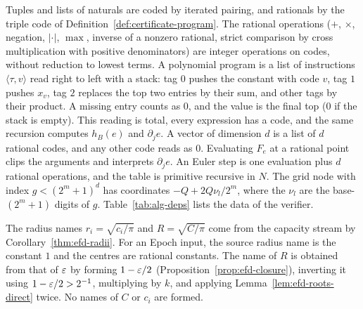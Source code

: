 Tuples and lists of naturals are coded by iterated pairing, and rationals by the triple code of Definition~\ref{def:certificate-program}. The rational operations ($+$, $\times$, negation, $|\cdot|$, $\max$, inverse of a nonzero rational, strict comparison by cross multiplication with positive denominators) are integer operations on codes, without reduction to lowest terms. A polynomial program is a list of instructions $\langle\tau,v\rangle$ read right to left with a stack: tag $0$ pushes the constant with code $v$, tag $1$ pushes $x_v$, tag $2$ replaces the top two entries by their sum, and other tags by their product. A missing entry counts as $0$, and the value is the final top ($0$ if the stack is empty). This reading is total, every expression has a code, and the same recursion computes $h_B(e)$ and $\partial_je$. A vector of dimension $d$ is a list of $d$ rational codes, and any other code reads as $0$. Evaluating $F_e$ at a rational point clips the arguments and interprets $\partial_je$. An Euler step is one evaluation plus $d$ rational operations, and the table is primitive recursive in $N$. The grid node with index $g<(2^m+1)^d$ has coordinates $-Q+2Q\nu_l/2^m$, where the $\nu_l$ are the base-$(2^m+1)$ digits of $g$. Table~\ref{tab:alg-deps} lists the data of the verifier.

The radius names $r_i=\sqrt{c_i/\pi}$ and $R=\sqrt{C/\pi}$ come from the capacity stream by Corollary~\ref{thm:efd-radii}. For an Epoch input, the source radius name is the constant $1$ and the centres are rational constants. The name of $R$ is obtained from that of $\varepsilon$ by forming $1-\varepsilon/2$ (Proposition~\ref{prop:efd-closure}), inverting it using $1-\varepsilon/2>2^{-1}$, multiplying by $k$, and applying Lemma~\ref{lem:efd-roots-direct} twice. No names of $C$ or $c_i$ are formed.

